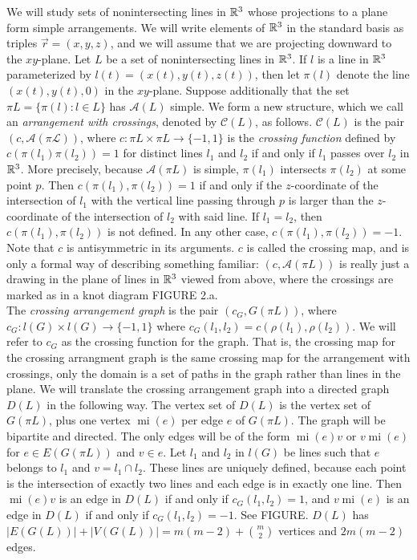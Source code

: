 \documentclass[11pt, oneside]{article}
\newcommand{\mi}{\operatorname{mi}}
\begin{document}
We will study sets of nonintersecting lines in $\mathbb{R}^3$ whose projections to a plane form simple arrangements. We will write elements of $\mathbb{R}^3$ in the standard basis as triples $\vec{r} = (x, y, z)$, and we will assume that we are projecting downward to the $xy$-plane. Let $L$ be a set of nonintersecting lines in $\mathbb{R}^3$. If $l$ is a line in $\mathbb{R}^3$ parameterized by $l(t) = (x(t), y(t), z(t))$, then let $\pi(l)$ denote the line $(x(t), y(t), 0)$ in the $xy$-plane. Suppose additionally that the set $\pi L = \{\pi(l): l \in L\}$ has $\mathcal{A}(L)$ simple. We form a new structure, which we call an \emph{arrangement with crossings}, denoted by $\mathcal{C}(L)$, as follows. 
$\mathcal{C}(L)$ is the pair $(c, \mathcal{A(\pi L)})$, where $c: \pi L \times \pi L \to \{-1, 1\}$ is the \emph{crossing function} defined by $c(\pi(l_1) \pi(l_2)) = 1$ for distinct lines $l_1$ and $l_2$ if and only if $l_1$ passes over $l_2$ in $\mathbb{R}^3$. More precisely, because $\mathcal{A}(\pi L)$ is simple, $\pi(l_1)$ intersects $\pi(l_2)$ at some point $p$. Then $c(\pi(l_1), \pi(l_2)) = 1$ if and only if the $z$-coordinate of the intersection of $l_1$ with the vertical line passing through $p$ is larger than the $z$-coordinate of the intersection of $l_2$ with said line. If $l_1 = l_2$, then $c(\pi(l_1), \pi(l_2))$ is not defined. In any other case, $c(\pi(l_1), \pi(l_2)) = -1$. Note that $c$ is antisymmetric in its arguments. $c$ is called the crossing map, and is only a formal way of describing something familiar: $(c, \mathcal{A}(\pi L))$ is really just a drawing in the plane of lines in $\mathbb{R}^3$ viewed from above, where the crossings are marked as in a knot diagram FIGURE 2.a. \\

The \emph{crossing arrangement graph} is the pair $(c_G, G(\pi L))$, where $c_G: l(G) \times l(G) \to \{-1,1\}$ where $c_G(l_1, l_2) = c(\rho(l_1), \rho(l_2))$. We will refer to $c_G$ as the crossing function for the graph. That is, the crossing map for the crossing arrangment graph is the same crossing map for the arrangement with crossings, only the domain is a set of paths in the graph rather than lines in the plane. 
We will translate the crossing arrangement graph into a directed graph $D(L)$ in the following way. The vertex set of $D(L)$ is the vertex set of $G(\pi L)$, plus one vertex $\mi(e)$ per edge $e$ of $G(\pi L)$. The graph will be bipartite and directed. The only edges will be of the form $\mi(e)v$ or $v \mi(e)$ for $e \in E(G(\pi L))$ and $v \in e$. Let $l_1$ and $l_2$ in $l(G)$ be lines such that $e$ belongs to $l_1$ and $v = l_1 \cap l_2$. 
These lines are uniquely defined, because each point is the intersection of exactly two lines and each edge is in exactly one line. Then $\mi(e)v$ is an edge in $D(L)$ if and only if $c_G(l_1, l_2) = 1$, and $v \mi(e)$ is an edge in $D(L)$ if and only if $c_G(l_1, l_2) = -1$. See FIGURE. $D(L)$ has $|E(G(L))| +  |V(G(L))| = m(m-2) + { m \choose 2}$ vertices and $2m(m-2)$ edges. \\
\end{document}

